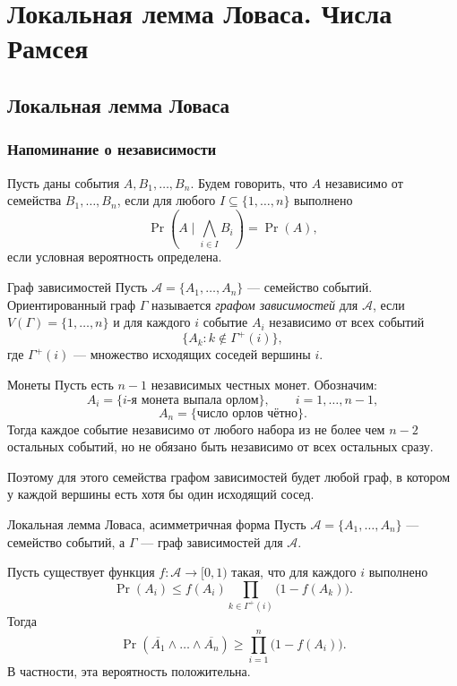 \section{Локальная лемма Ловаса. Числа Рамсея}

\subsection{Локальная лемма Ловаса}

\subsubsection*{Напоминание о независимости}

Пусть даны события $A, B_1, \dots, B_n$.
Будем говорить, что $A$ независимо от семейства $B_1,\dots,B_n$, если для любого
$I \subseteq \{1,\dots,n\}$ выполнено
\[
\Pr\!\left(A \mid \bigwedge_{i \in I} B_i\right)=\Pr(A),
\]
если условная вероятность определена.

\begin{Definition}{Граф зависимостей}{}
	Пусть $\mathcal A=\{A_1,\dots,A_n\}$ — семейство событий.
	Ориентированный граф $\Gamma$ называется \emph{графом зависимостей} для $\mathcal A$,
	если $V(\Gamma)=\{1,\dots,n\}$ и для каждого $i$ событие $A_i$ независимо от всех событий
	\[
	\{A_k : k \notin \Gamma^+(i)\},
	\]
	где $\Gamma^+(i)$ — множество исходящих соседей вершины $i$.
\end{Definition}

\begin{Example}{Монеты}{}
	Пусть есть $n-1$ независимых честных монет. Обозначим:
	\[
	A_i=\{\text{$i$-я монета выпала орлом}\}, \qquad i=1,\dots,n-1,
	\]
	\[
	A_n=\{\text{число орлов чётно}\}.
	\]
	Тогда каждое событие независимо от любого набора из не более чем $n-2$ остальных событий,
	но не обязано быть независимо от всех остальных сразу.
	
	Поэтому для этого семейства графом зависимостей будет любой граф, в котором у каждой вершины
	есть хотя бы один исходящий сосед.
\end{Example}

\begin{Theorem}{Локальная лемма Ловаса, асимметричная форма}{} 
	Пусть $\mathcal A=\{A_1,\dots,A_n\}$ — семейство событий, а $\Gamma$ — граф зависимостей
	для $\mathcal A$.
	
	Пусть существует функция $f:\mathcal A \to [0,1)$ такая, что для каждого $i$ выполнено
	\[
	\Pr(A_i)
	\le
	f(A_i)\prod_{k\in \Gamma^+(i)}\bigl(1-f(A_k)\bigr).
	\]
	Тогда
	\[
	\Pr\!\left(\overline{A_1}\wedge \dots \wedge \overline{A_n}\right)
	\ge
	\prod_{i=1}^{n}\bigl(1-f(A_i)\bigr).
	\]
	В частности, эта вероятность положительна.
\end{Theorem}

